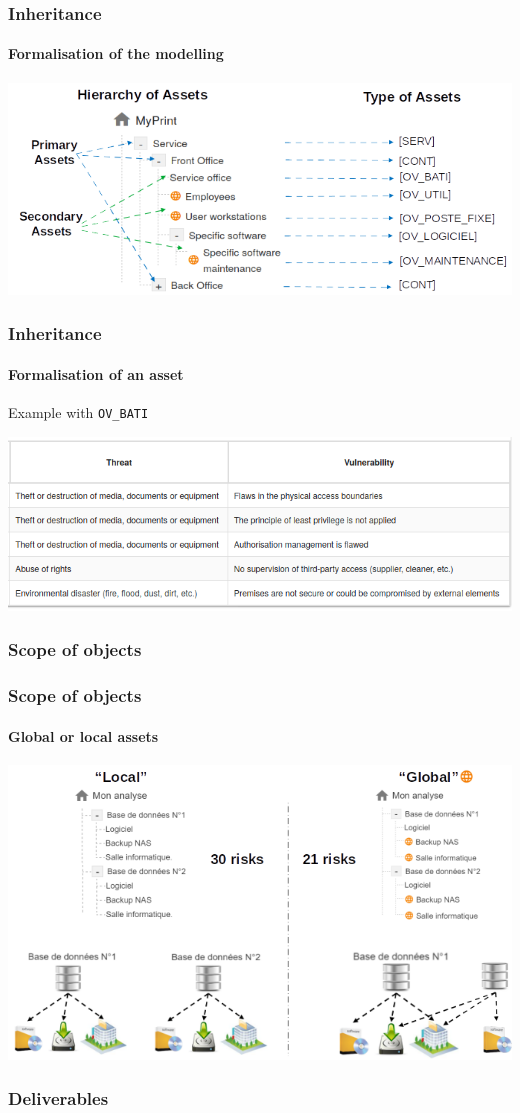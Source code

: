 \begin{frame}
    \frametitle{Inheritance}
    \framesubtitle{Formalisation of the modelling}
    \begin{center}
        \includegraphics[scale=0.5]{./images/MONARC-modelling-formalisation.png}
    \end{center}
\end{frame}

\begin{frame}
    \frametitle{Inheritance}
    \framesubtitle{Formalisation of an asset}
    Example with \texttt{OV\_BATI}
    \begin{center}
        \includegraphics[scale=0.7]{./images/ov_bati.png}
    \end{center}
\end{frame}

\subsubsection{Scope of objects}
\begin{frame}
    \frametitle{Scope of objects}
    \framesubtitle{Global or local assets}
    \begin{center}
        \begin{center}
            \includegraphics[scale=0.45]{./images/global-vs-local.png}
        \end{center}
    \end{center}
\end{frame}

\subsubsection{Deliverables}
